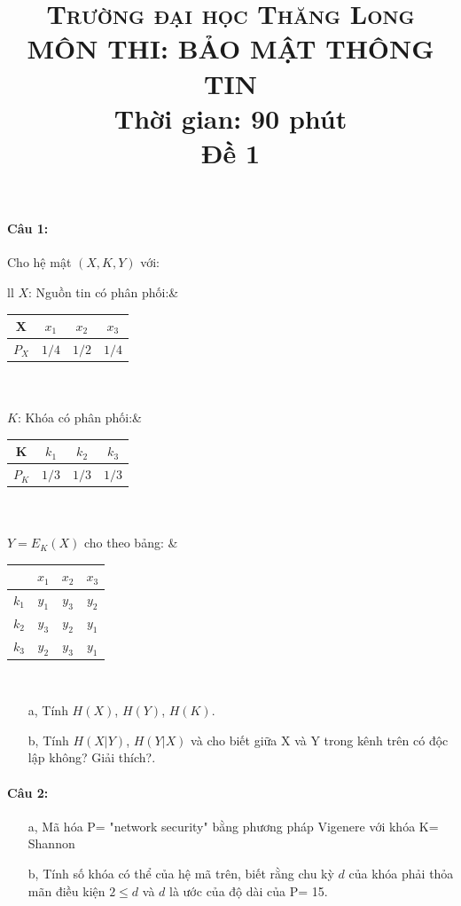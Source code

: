 \documentclass[paper=a4, fontsize=11pt]{scrartcl}
\title{
	\usefont{OT1}{bch}{b}{n}
	\normalfont \normalsize \textsc{Trường đại học Thăng Long} \\
	\Large MÔN THI: \textbf{BẢO MẬT THÔNG TIN}\\
	\Large Thời gian: \textbf{90 phút}\\
	Đề 1
}
\date{}
\numberwithin{equation}{section}		%
\numberwithin{figure}{section}			%
\numberwithin{table}{section}				%
\begin{document}
	\maketitle
	
	\paragraph{Câu 1:} Cho hệ mật $(X, K, Y)$ với:\\
	\begin{tabular}{ll}
		$X$: Nguồn tin có phân phối:& 
		\begin{tabular}{|c|c|c|c|}
			\hline 
			X     & $x_1$ & $x_2$ & $x_3$\\
			\hline 
			$P_X$ & $1/4$ & $1/2$ & $1/4$\\
			\hline 
		\end{tabular} \\\\
		$K$: Khóa có phân phối:& 
		\begin{tabular}{|c|c|c|c|}
			\hline 
			K     & $k_1$ & $k_2$ & $k_3$\\
			\hline 
			$P_K$ & $1/3$ & $1/3$ & $1/3$\\
			\hline 
		\end{tabular} \\\\ 
		$Y= E_K(X)$ cho theo bảng:	
		&
		\begin{tabular}{|c|c|c|c|}
			\hline 
			& $x_1$ & $x_2$ & $x_3$\\
			\hline 
			$k_1$ & $y_1$  & $y_3$    & $y_2$    \\
			\hline 
			$k_2$ & $y_3$      & $y_2$    & $y_1$    \\
			\hline 
			$k_3$ & $y_2$      & $y_3$    & $y_1$   \\
			\hline 
		\end{tabular}\\
	\end{tabular} 
	
	\begin{itemize}
		\item[a,] Tính $H(X)$, $H(Y)$, $H(K)$.
		\item[b,] Tính $H(X|Y)$, $H(Y|X)$ và cho biết giữa X và Y trong kênh trên có độc lập không? Giải thích?.
	\end{itemize}	
	
	\paragraph{Câu 2:}
	\begin{itemize}
		\item[a,] Mã hóa P= "network security" bằng phương pháp Vigenere với khóa K= Shannon
		\item[b,] Tính số khóa có thể của hệ mã trên, biết rằng chu kỳ $d$ của khóa phải thỏa mãn điều kiện $2 \leq d$ và $d$ là ước của độ dài của P= 15.
	\end{itemize}
	
\end{document}
